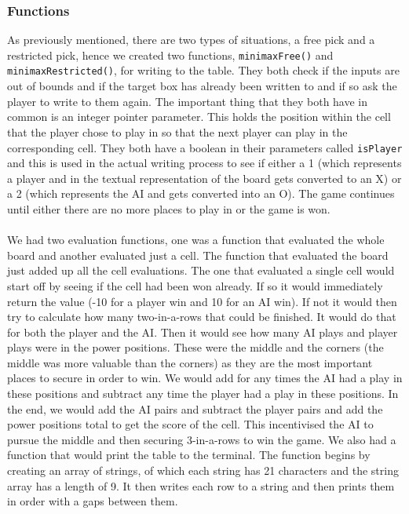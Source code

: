 \documentclass[11pt]{article}
\begin{document}
\subsubsection{Functions}
As previously mentioned, there are two types of situations, a free pick and a restricted pick, hence we created two functions, {\tt{minimaxFree()}} and {\tt{minimaxRestricted()}}, for writing to the table. They both check if the inputs are out of bounds and if the target box has already been written to and if so ask the player to write to them again. The important thing that they both have in common is an integer pointer parameter. This holds the position within the cell that the player chose to play in so that the next player can play in the corresponding cell. They both have a boolean in their parameters called {\tt{isPlayer}} and this is used in the actual writing process to see if either a 1 (which represents a player and in the textual representation of the board gets converted to an X) or a 2 (which represents the AI and gets converted into an O).
The game continues until either there are no more places to play in or the game is won.
\\\\We had two evaluation functions, one was a function that evaluated the whole board and another evaluated just a cell. The function that evaluated the board just added up all the cell evaluations. The one that evaluated a single cell would start off by seeing if the cell had been won already. If so it would immediately return the value (-10 for a player win and 10 for an AI win). If not it would then try to calculate how many two-in-a-rows that could be finished. It would do that for both the player and the AI. Then it would see how many AI plays and player plays were in the power positions. These were the middle and the corners (the middle was more valuable than the corners) as they are the most important places to secure in order to win. We would add for any times the AI had a play in these positions and subtract any time the player had a play in these positions. In the end, we would add the AI pairs and subtract the player pairs and add the power positions total to get the score of the cell. This incentivised the AI to pursue the middle and then securing 3-in-a-rows to win the game.
We also had a function that would print the table to the terminal. The function begins by creating an array of strings, of which each string has 21 characters and the string array has a length of 9. It then writes each row to a string and then prints them in order with a gaps between them.
\end{document}
